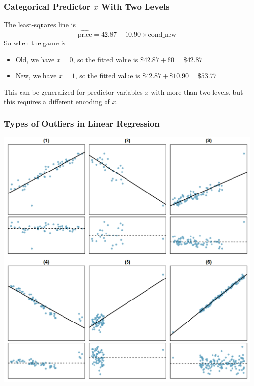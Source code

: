 \documentclass[slides]{beamer}
\begin{document}
\begin{frame}[fragile]
\frametitle{Categorical Predictor $x$ With Two Levels}
The least-squares line is
\[
\widehat{\mbox{price}} = 42.87 + 10.90 \times \mbox{cond\_new}
\]
\pause
So when the game is
\begin{itemize}
\item Old, we have $x=0$, so the fitted value is $\$42.87 + \$0 = \$42.87$
\item New, we have $x=1$, so the fitted value is $\$42.87 + \$10.90 = \$53.77$
\end{itemize}
\pause
This can be generalized for predictor variables $x$ with more than two levels, but this requires a different encoding of $x$.

\end{frame}


\begin{frame}[fragile]
\frametitle{Types of Outliers in Linear Regression}
\begin{center}
\includegraphics[height=0.8\textheight]{figure/outliers.png}
\end{center}
\end{frame}
\end{document}
